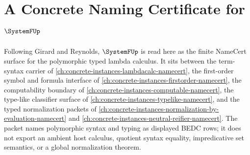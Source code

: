 \chapter{A Concrete Naming Certificate for $\SystemFUp$}
\label{ch:concrete-instances-system-f-namecert}

Following Girard and Reynolds, $\SystemFUp$ is read here as the finite NameCert surface for the polymorphic typed lambda calculus. It sits between the term-syntax carrier of \autoref{ch:concrete-instances-lambdacalc-namecert}, the first-order symbol and formula interface of \autoref{ch:concrete-instances-firstorder-namecert}, the computability boundary of \autoref{ch:concrete-instances-computable-namecert}, the type-like classifier surface of \autoref{ch:concrete-instances-typelike-namecert}, and the typed normalization packets of \autoref{ch:concrete-instances-normalization-by-evaluation-namecert} and \autoref{ch:concrete-instances-neutral-reifier-namecert}. The packet names polymorphic syntax and typing as displayed BEDC rows; it does not export an ambient host calculus, quotient syntax equality, impredicative set semantics, or a global normalization theorem.

